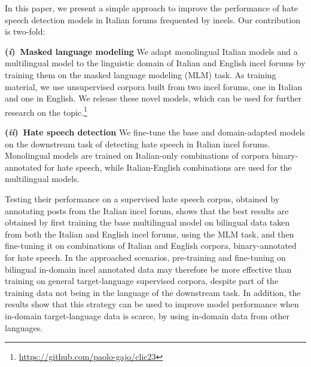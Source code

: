 \documentclass[11pt]{article}
\newcommand{\Ni}{({\em i})~}
\newcommand{\Nii}{({\em ii})~}
\newcommand{\todoA}[1]{\todo[color=blue!40]{A: #1}}
\begin{document}
In this paper, we present a simple approach to improve the performance of hate speech detection models in Italian forums frequented by incels. Our contribution is two-fold:


\noindent\textbf{\Ni Masked language modeling} We adapt monolingual Italian models and a multilingual model to the linguistic domain of Italian and English incel forums by training them on the masked language modeling (MLM) task.
As training material, we use unsupervised corpora built from two incel forums, one in Italian and one in English.
We release these novel models, which can be used for further research on the topic.\footnote{\url{https://github.com/paolo-gajo/clic23}}

\noindent\textbf{\Nii Hate speech detection}
We fine-tune the base and domain-adapted models on the downstream task of detecting hate speech in Italian incel forums. 
Monolingual models are trained on Italian-only combinations of corpora binary-annotated for hate speech, while Italian-English combinations are used for the multilingual models.

Testing their performance on a supervised hate speech corpus, obtained by annotating posts from the Italian incel forum, shows that the best results are obtained by first training the base multilingual model on bilingual data taken from both the Italian and English incel forums, using the MLM task, and then fine-tuning it on combinations of Italian and English corpora, binary-annotated for hate speech. In the approached scenarios, pre-training and fine-tuning on bilingual in-domain incel annotated data may therefore be more effective than training on general target-language supervised corpora, despite part of the training data not being in the language of the downstream task. In addition, the results show that this strategy can be used to improve model performance when in-domain target-language data is scarce, by using in-domain data from other languages.
\end{document}
